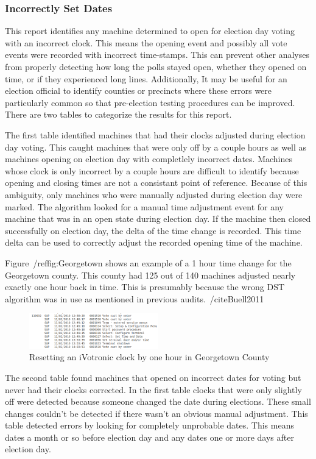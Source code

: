 \subsubsection{Incorrectly Set Dates}
This report identifies any machine determined to open for election day voting with an incorrect clock.  This means the opening event and possibly all vote events were recorded with incorrect time-stamps. This can prevent other analyses from properly detecting how long the polls stayed open, whether they opened on time, or if they experienced long lines. Additionally, It may be useful for an election official to identify counties or precincts where these errors were particularly common so that pre-election testing procedures can be improved. There are two tables to categorize the results for this report.

The first table identified machines that had their clocks adjusted during election day voting. This caught machines that were only off by a couple hours as well as machines opening on election day with completlely incorrect dates.  Machines whose clock is only incorrect by a couple hours are difficult to identify because opening and closing times are not a consistant point of reference. Because of this ambiguity, only machines who were manually adjusted during election day were marked. The algorithm looked for a manual time adjustment event for any machine that was in an open state during election day.  If the machine then closed successfully on election day, the delta of the time change is recorded. This time delta can be used to correctly adjust the recorded opening time of the machine.

Figure~/ref{fig:Georgetown} shows an example of a 1 hour time change for the Georgetown county.  This county had 125 out of 140 machines adjusted nearly exactly one hour back in time.  This is presumably because the wrong DST algorithm was in use as mentioned in previous audits.~/cite{Buell2011}
\begin{figure}[h!]
  \caption{Resetting an iVotronic clock by one hour in Georgetown County}
  \label{fig:Georgetown}
  \centering
    \includegraphics[width=0.5\textwidth]{datefig1.png}
\end{figure}

The second table found machines that opened on incorrect dates for voting but never had their clocks corrected.  In the first table clocks that were only slightly off were detected because someone changed the date during elections.  These small changes couldn't be detected if there wasn't an obvious manual adjustment. This table detected errors by looking for completely unprobable dates. This means dates a month or so before election day and any dates one or more days after election day.

